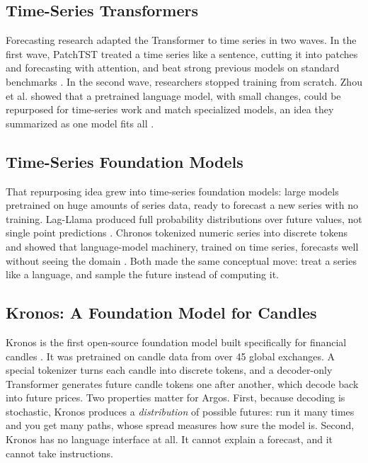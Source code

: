 \documentclass[conference]{IEEEtran}
\newcommand{\sys}{Argos}
\begin{document}
\subsection{Time-Series Transformers}

Forecasting research adapted the Transformer to time series in two waves. In the first wave, PatchTST treated a time series like a sentence, cutting it into patches and forecasting with attention, and beat strong previous models on standard benchmarks \cite{nie2023patchtst}. In the second wave, researchers stopped training from scratch. Zhou et al. showed that a pretrained language model, with small changes, could be repurposed for time-series work and match specialized models, an idea they summarized as one model fits all \cite{zhou2023onefitsall}.

\subsection{Time-Series Foundation Models}

That repurposing idea grew into time-series foundation models: large models pretrained on huge amounts of series data, ready to forecast a new series with no training. Lag-Llama produced full probability distributions over future values, not single point predictions \cite{rasul2023lagllama}. Chronos tokenized numeric series into discrete tokens and showed that language-model machinery, trained on time series, forecasts well without seeing the domain \cite{ansari2024chronos}. Both made the same conceptual move: treat a series like a language, and sample the future instead of computing it.

\subsection{Kronos: A Foundation Model for Candles}

Kronos is the first open-source foundation model built specifically for financial candles \cite{shi2025kronos}. It was pretrained on candle data from over 45 global exchanges. A special tokenizer turns each candle into discrete tokens, and a decoder-only Transformer generates future candle tokens one after another, which decode back into future prices. Two properties matter for \sys{}. First, because decoding is stochastic, Kronos produces a \emph{distribution} of possible futures: run it many times and you get many paths, whose spread measures how sure the model is. Second, Kronos has no language interface at all. It cannot explain a forecast, and it cannot take instructions.
\end{document}
